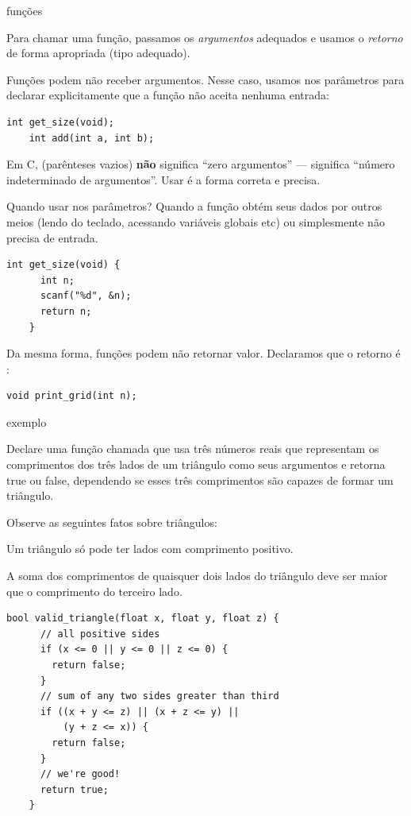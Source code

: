 \documentclass{beamer}
\begin{document}
\begin{frame}{funções}
  \framebreak

  Para chamar uma função, passamos os \emph{argumentos} adequados e
  usamos o \emph{retorno} de forma apropriada (tipo adequado).

  Funções podem não receber argumentos. Nesse caso, usamos
   nos parâmetros para declarar explicitamente que a
  função não aceita nenhuma entrada:

  \begin{lstlisting}[style=normalc]
    int get_size(void);   
    int add(int a, int b); 
  \end{lstlisting}

  Em C,  (parênteses vazios) \textbf{não} significa
  ``zero argumentos'' --- significa ``número indeterminado de
  argumentos''. Usar  é a forma correta e precisa.

  \framebreak

  Quando usar  nos parâmetros? Quando a função obtém seus
  dados por outros meios (lendo do teclado, acessando variáveis
  globais etc) ou simplesmente não precisa de entrada.

  \begin{lstlisting}[style=normalc]
    int get_size(void) {
      int n;
      scanf("%d", &n);
      return n;
    }
  \end{lstlisting}

  Da mesma forma, funções podem não retornar valor. Declaramos que o
  retorno é :

  \begin{lstlisting}[style=normalc]
    void print_grid(int n); 
  \end{lstlisting}

\end{frame}

\begin{frame}{exemplo}

  Declare uma função chamada  que usa três
  números reais que representam os comprimentos dos três lados de um
  triângulo como seus argumentos e retorna true ou false, dependendo
  se esses três comprimentos são capazes de formar um triângulo.

  Observe as seguintes fatos sobre triângulos:

  Um triângulo só pode ter lados com comprimento positivo.

  A soma dos comprimentos de quaisquer dois lados do triângulo deve
  ser maior que o comprimento do terceiro lado.

  \framebreak

  \begin{lstlisting}[style=normalc]
    bool valid_triangle(float x, float y, float z) {
      // all positive sides
      if (x <= 0 || y <= 0 || z <= 0) {
        return false;
      }
      // sum of any two sides greater than third
      if ((x + y <= z) || (x + z <= y) ||
          (y + z <= x)) {
        return false;
      }
      // we're good!
      return true;
    }
  \end{lstlisting}

\end{frame}
\end{document}
